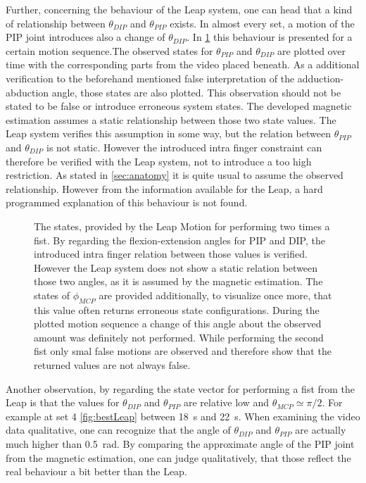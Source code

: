 Further, concerning the behaviour of the Leap system, one can head that a kind of relationship between $ \theta_{DIP} $ and $ \theta_{PIP} $ exists. In almost every set, a motion of the \ac{PIP} joint introduces also a change of $ \theta_{DIP} $. In \ref{fig:set14} this behaviour is presented for a certain motion sequence.The observed states for $ \theta_{PIP} $ and $ \theta_{DIP} $ are plotted over time with the corresponding parts from the video placed beneath. As a additional verification to the beforehand mentioned false interpretation of the adduction-abduction angle, those states are also plotted. This observation should not be stated to be false or introduce erroneous system states. The developed magnetic estimation assumes a static relationship between those two state values. The Leap system verifies this assumption in some way, but the relation between $ \theta_{PIP} $ and $ \theta_{DIP} $ is not static. However the introduced intra finger constraint can therefore be verified with the Leap system, not to introduce a too high restriction. As stated in \ref{sec:anatomy} it is quite usual to assume the observed relationship. However from the information available for the Leap, a hard programmed explanation of this behaviour is not found. 
\begin{figure}[!htb]
\centering
{}
\caption[Relationship between $ \theta_{PIP} $ and $ \theta_{DIP} $ observed by Leap Motion]
{The states, provided by the Leap Motion for performing two times a fist. By regarding the flexion-extension angles for \ac{PIP} and \ac{DIP}, the introduced intra finger relation between those values is verified. However the Leap system does not show a static relation between those two angles, as it is assumed by the magnetic estimation. The states of $ \phi_{MCP} $ are provided additionally, to visualize once more, that this value often returns erroneous state configurations. During the plotted motion sequence a change of this angle about the observed amount was definitely not performed. While performing the second fist only smal false motions are observed and therefore show that the returned values are not always false.}
\label{fig:set14}
\end{figure}
Another observation, by regarding the state vector for performing a fist from the Leap is that the values for $ \theta_{DIP} $ and $ \theta_{PIP} $ are relative low and $ \theta_{MCP} \simeq \pi/2 $. For example at set 4 \ref{fig:bestLeap} between \SI{18}{\second} and \SI{22}{\second}. When examining the video data qualitative, one can recognize that the angle of $ \theta_{DIP} $ and $ \theta_{PIP} $ are actually much higher than \SI{0.5}{\radian}. By comparing the approximate angle of the \ac{PIP} joint from the magnetic estimation, one can judge qualitatively, that those reflect the real behaviour a bit better than the Leap. 

